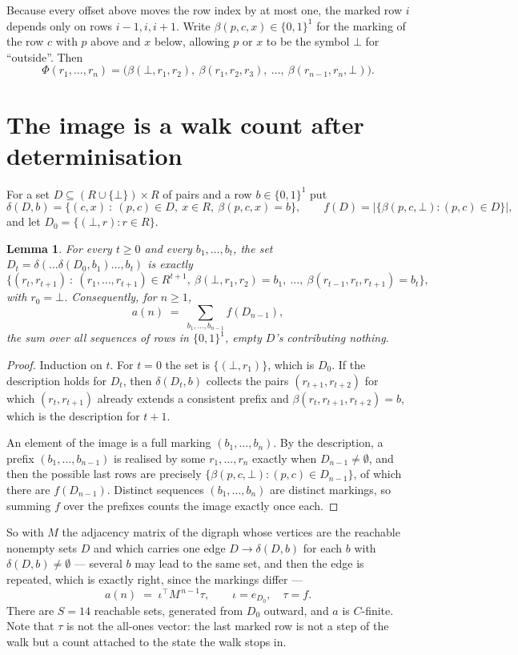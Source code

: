\documentclass[11pt,a4paper]{article}
\theoremstyle{plain}
\newtheorem{lemma}[theorem]{Lemma}
\theoremstyle{definition}
\begin{document}
Because every offset above moves the row index by at most one, the marked row $i$ depends only
on rows $i-1,i,i+1$. Write $\beta(p,c,x)\in\{0,1\}^{1}$ for the marking of the row $c$
with $p$ above and $x$ below, allowing $p$ or $x$ to be the symbol $\bot$ for ``outside''.
Then
\[
\Phi(r_1,\dots,r_n)=\bigl(\beta(\bot,r_1,r_2),\ \beta(r_1,r_2,r_3),\ \dots,\
\beta(r_{n-1},r_n,\bot)\bigr).
\]

\section{The image is a walk count after determinisation}

For a set $D\subseteq(R\cup\{\bot\})\times R$ of pairs and a row $b\in\{0,1\}^{1}$ put
\[
\delta(D,b)=\{(c,x)\ :\ (p,c)\in D,\ x\in R,\ \beta(p,c,x)=b\},\qquad
f(D)=\bigl|\{\beta(p,c,\bot):(p,c)\in D\}\bigr| ,
\]
and let $D_0=\{(\bot,r):r\in R\}$.

\begin{lemma}\label{lem:det}
For every $t\ge0$ and every $b_1,\dots,b_t$, the set
$D_t=\delta(\dots\delta(D_0,b_1)\dots,b_t)$ is exactly
\[
\{(r_t,r_{t+1})\ :\ (r_1,\dots,r_{t+1})\in R^{t+1},\ \beta(\bot,r_1,r_2)=b_1,\ \dots,\
\beta(r_{t-1},r_t,r_{t+1})=b_t\} ,
\]
with $r_0=\bot$. Consequently, for $n\ge1$,
\[
a(n)\;=\;\sum_{b_1,\dots,b_{n-1}}f(D_{n-1}),
\]
the sum over all sequences of rows in $\{0,1\}^{1}$, empty $D$'s contributing nothing.
\end{lemma}

\begin{proof}
Induction on $t$. For $t=0$ the set is $\{(\bot,r_1)\}$, which is $D_0$. If the description
holds for $D_t$, then $\delta(D_t,b)$ collects the pairs $(r_{t+1},r_{t+2})$ for which
$(r_t,r_{t+1})$ already extends a consistent prefix and
$\beta(r_t,r_{t+1},r_{t+2})=b$, which is the description for $t+1$.

An element of the image is a full marking $(b_1,\dots,b_n)$. By the description, a prefix
$(b_1,\dots,b_{n-1})$ is realised by some $r_1,\dots,r_n$ exactly when $D_{n-1}\neq
\emptyset$, and then the possible last rows are precisely
$\{\beta(p,c,\bot):(p,c)\in D_{n-1}\}$, of which there are $f(D_{n-1})$. Distinct
sequences $(b_1,\dots,b_n)$ are distinct markings, so summing $f$ over the prefixes counts the
image exactly once each.
\end{proof}

So with $M$ the adjacency matrix of the digraph whose vertices are the reachable nonempty sets
$D$ and which carries one edge $D\to\delta(D,b)$ for each $b$ with $\delta(D,b)\neq\emptyset$
--- several $b$ may lead to the same set, and then the edge is repeated, which is exactly
right, since the markings differ ---
\[
a(n)\;=\;\iota^{\!\top}M^{\,n-1}\tau,\qquad \iota=e_{D_0},\quad \tau=f .
\]
There are $S=14$ reachable sets, generated from $D_0$ outward, and $a$ is $C$-finite. Note
that $\tau$ is not the all-ones vector: the last marked row is not a step of the walk but a
count attached to the state the walk stops in.
\end{document}

